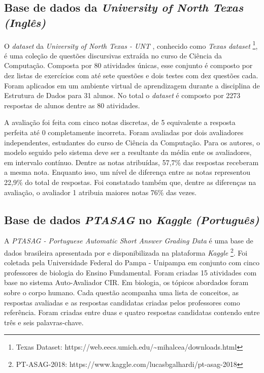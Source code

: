 \subsection{Base de dados da \textit{University of North Texas} \textit{(Inglês)}}
\label{ntexasunv-db}

O \textit{dataset} da \textit{University of North Texas - UNT} \cite{mohler2011}, conhecido como \textit{Texas dataset} \footnote{Texas Dataset: https://web.eecs.umich.edu/{\textasciitilde}mihalcea/downloads.html}, é uma coleção de questões discursivas extraída no curso de Ciência da Computação. Composta por 80 atividades únicas, esse conjunto é composto por dez listas de exercícios com até sete questões e dois testes com dez questões cada. Foram aplicados em um ambiente virtual de aprendizagem durante a disciplina de Estrutura de Dados para 31 alunos. No total o \textit{dataset} é composto por 2273 respostas de alunos dentre as 80 atividades.

A avaliação foi feita com cinco notas discretas, de 5 equivalente a resposta perfeita até 0 completamente incorreta. Foram avaliadas por dois avaliadores independentes, estudantes do curso de Ciência da Computação. Para os autores, o modelo seguido pelo sistema deve ser a resultante da média ente os avaliadores, em intervalo contínuo. Dentre as notas atribuídas, 57,7\% das respostas receberam a mesma nota. Enquanto isso, um nível de diferença entre as notas representou 22,9\% do total de respostas. Foi constatado também que, dentre as diferenças na avaliação, o avaliador 1 atribuia maiores notas 76\% das vezes.

\subsection{Base de dados \textit{PTASAG} no \textit{Kaggle} \textit{(Português)}}
\label{ptasag-db}

A \textit{PTASAG - Portuguese Automatic Short Answer Grading Data} é uma base de dados brasileira apresentada por \cite{galhardi2018b} e disponibilizada na plataforma \textit{Kaggle} \footnote{PT-ASAG-2018: https://www.kaggle.com/lucasbgalhardi/pt-asag-2018}. Foi coletada pela Universidade Federal do Pampa - Unipampa em conjunto com cinco professores de biologia do Ensino Fundamental. Foram criadas 15 atividades com base no sistema Auto-Avaliador CIR. Em biologia, os tópicos abordados foram sobre o corpo humano. Cada questão acompanha uma lista de conceitos, as respostas avaliadas e as respostas candidatas criadas pelos professores como referência. Foram criadas entre duas e quatro respostas candidatas contendo entre três e seis palavras-chave.

